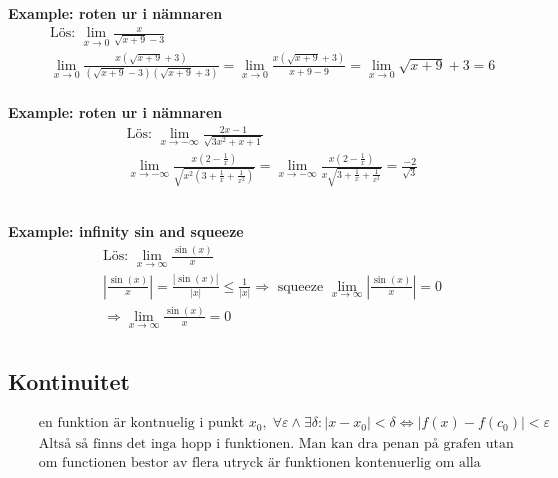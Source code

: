 \textbf{Example: roten ur i nämnaren}
\begin{align*}
  &\quad  \text{Lös: } \lim_{x\to 0} \frac{x}{\sqrt{x+9}-3}  \\
  &\quad  \lim_{x\to 0} \frac{x(\sqrt{x+9}+3)}{(\sqrt{x+9}-3)(\sqrt{x+9}+3)} =
  \lim_{x\to 0} \frac{x(\sqrt{x+9}+3)}{x+9-9} = \lim_{x\to 0} \sqrt{x+9}+3 = 6   \\
\end{align*}

\textbf{Example: roten ur i nämnaren}
\begin{align*}
  &\quad  \text{Lös: } \lim_{x\to-\infty} \frac{2x-1}{\sqrt{3x^2+x+1}}  \\
  &\quad  \lim_{x\to-\infty} \frac{x(2-\frac{1}{x})}{\sqrt{x^2(3+\frac{1}{x}+\frac{1}{x^2})}} =
  \lim_{x\to-\infty} \frac{x(2-\frac{1}{x})}{x\sqrt{3+\frac{1}{x}+\frac{1}{x^2}}} = \frac{-2}{\sqrt{3}} \\
  &\quad   \\
  &\quad   \\
\end{align*}

\textbf{Example: infinity sin and squeeze}
\begin{align*}
  &\quad  \text{Lös: } \lim_{x\to\infty}\frac{\sin(x)}{x}  \\
  &\quad  |\frac{\sin(x)}{x}| = \frac{|\sin(x)|}{|x|} \leq \frac{1}{|x|} \Rightarrow \text{ squeeze }
  \lim_{x\to\infty}|\frac{\sin(x)}{x}| = 0  \\
  &\quad  \Rightarrow \lim_{x\to\infty}\frac{\sin(x)}{x} = 0  \\
\end{align*}


\subsection{Kontinuitet}
\begin{align*}
  &\quad  \text{en funktion är kontnuelig i punkt } x_0, \; \forall \varepsilon \land \exists \delta: |x-x_0| < \delta \Leftrightarrow |f(x)-f(c_0)|<\varepsilon \\
  &\quad  \text{Altså så finns det inga hopp i funktionen. Man kan dra penan på grafen utan att släppa} \\
  &\quad  \text{om functionen bestor av flera utryck är funktionen kontenuerlig om alla utrycken är det } \\
\end{align*}


\newpage

